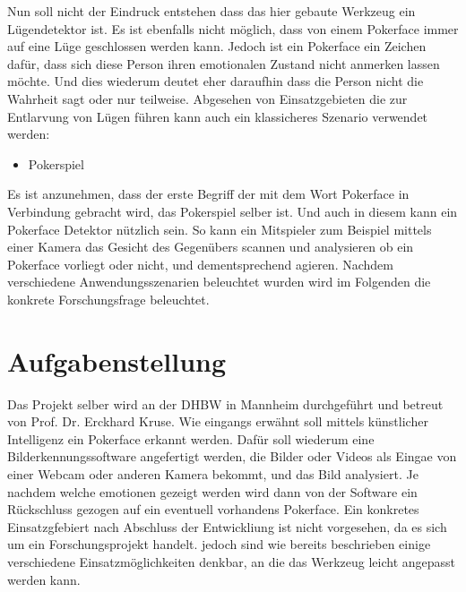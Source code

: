 \documentclass[12pt, a4paper]{scrbook}
\begin{document}
Nun soll nicht der Eindruck entstehen dass das hier gebaute Werkzeug ein Lügendetektor ist. Es ist ebenfalls nicht möglich, dass von einem Pokerface immer auf eine Lüge geschlossen werden kann.
Jedoch ist ein Pokerface ein Zeichen dafür, dass sich diese Person ihren emotionalen Zustand nicht anmerken lassen möchte. Und dies wiederum deutet eher daraufhin dass die Person nicht die
Wahrheit sagt oder nur teilweise.
Abgesehen von Einsatzgebieten die zur Entlarvung von Lügen führen kann auch ein klassicheres Szenario verwendet werden:
\begin{itemize}
	\item{Pokerspiel}
\end{itemize}
Es ist anzunehmen, dass der erste Begriff der mit dem Wort Pokerface in Verbindung gebracht wird, das Pokerspiel selber ist. Und auch in diesem kann ein Pokerface Detektor nützlich sein. So kann
ein Mitspieler zum Beispiel mittels einer Kamera das Gesicht des Gegenübers scannen und analysieren ob ein Pokerface vorliegt oder nicht, und dementsprechend agieren.
Nachdem verschiedene Anwendungsszenarien beleuchtet wurden wird im Folgenden die konkrete Forschungsfrage beleuchtet.
\section{Aufgabenstellung}
 Das Projekt selber wird an der DHBW in Mannheim durchgeführt und betreut von Prof. Dr. Erckhard Kruse.
 Wie eingangs erwähnt soll mittels künstlicher Intelligenz ein Pokerface erkannt werden. 
Dafür soll wiederum eine Bilderkennungssoftware angefertigt werden, die Bilder oder Videos als Eingae von einer Webcam oder anderen Kamera bekommt, und das Bild analysiert. Je nachdem welche
emotionen gezeigt werden wird dann von der Software ein Rückschluss gezogen auf ein eventuell vorhandens Pokerface. Ein konkretes Einsatzgfebiert nach Abschluss der Entwickliung ist nicht
vorgesehen, da es sich um ein Forschungsprojekt handelt. jedoch sind wie bereits beschrieben einige verschiedene Einsatzmöglichkeiten denkbar, an die das Werkzeug leicht angepasst werden kann.

\end{document}
